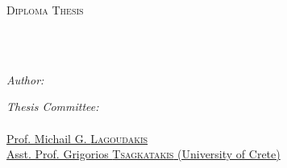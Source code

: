 \documentclass[
	12pt, %
	english,
	onehalfspacing, %
	liststotoc, %
	toctotoc, %
	parskip, %
	headsepline, %
]{MastersDoctoralThesis} %
\author{Emmanouil \textsc{Petrakos}} %
\begin{document}
\frontmatter %

\pagestyle{plain} %

\begin{titlepage}
	\begin{center}
		{\scshape\LARGE \univname\par}
		\vspace{0.4cm} %
		\textsc{\Large Diploma Thesis}\\[0.4cm] %

		\HRule \\[0.35cm] %
		{\huge \bfseries \ttitle\par}\vspace{0.35cm} %
		\HRule \\[0.35cm] %

		\begin{minipage}[t]{0.4\textwidth}
			\begin{flushleft} \large
				\emph{Author:}\\
				{\authorname} %
			\end{flushleft}
		\end{minipage}
		\begin{minipage}[t]{0.5\textwidth}
			\begin{flushright} \large
				\emph{Thesis Committee:} \\
				\href{https://www.ece.tuc.gr/index.php?id=4531&tx_tuclabspersonnel_list\%5Bperson\%5D=289&tx_tuclabspersonnel_list\%5Baction\%5D=person&tx_tuclabspersonnel_list\%5Bcontroller\%5D=List}{\supname}\\ %
				\href{https://www.ece.tuc.gr/index.php?id=4531&tx_tuclabspersonnel_list\%5Bperson\%5D=313&tx_tuclabspersonnel_list\%5Baction\%5D=person&tx_tuclabspersonnel_list\%5Bcontroller\%5D=List}{Prof. Michail G. \textsc{Lagoudakis}}\\
				\href{https://users.ics.forth.gr/~greg/}{Asst. Prof. Grigorios \textsc{Tsagkatakis} (University of Crete)}
			\end{flushright}
		\end{minipage}\\[0.1cm]


\end{center}
\end{titlepage}
\end{document}
